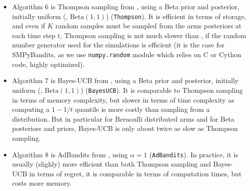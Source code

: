 \begin{itemize}
    \item Algorithm 6 is
    Thompson sampling from \cite{Kaufmann12Thompson}, using a Beta prior and posterior, initially uniform (\ie, $\mathrm{Beta}(1,1)$) (\texttt{Thompson}).
    It is efficient in terms of storage, and even if $K$ random samples must be sampled from the arms posteriors at each time step $t$, Thompson sampling is not much slower than \UCB, if the random number generator used for the simulations is efficient (it is the case for SMPyBandits, as we use \texttt{numpy.random} module which relies on C or Cython code, highly optimized).

    \item Algorithm 7 is
    Bayes-UCB from \cite{Kaufmann12BUCB}, using a Beta prior and posterior, initially uniform (\ie, $\mathrm{Beta}(1,1)$) (\texttt{BayesUCB}).
    It is comparable to Thompson sampling in terms of memory complexity, but slower in terms of time complexity as computing a $1-1/t$ quantile is more costly than sampling from a distribution.
    But in particular for Bernoulli distributed arms and for Beta posteriors and priors, Bayes-UCB is only about twice as slow as Thompson sampling.

    \item Algorithm 8 is
    AdBandits from \cite{Truzzi13}, using $\alpha=1$ (\texttt{AdBandits}).
    In practice, it is usually (slighly) more efficient than both Thompson sampling and Bayes-UCB in terms of regret, it is comparable in terms of computation times, but costs more memory.


\end{itemize}
